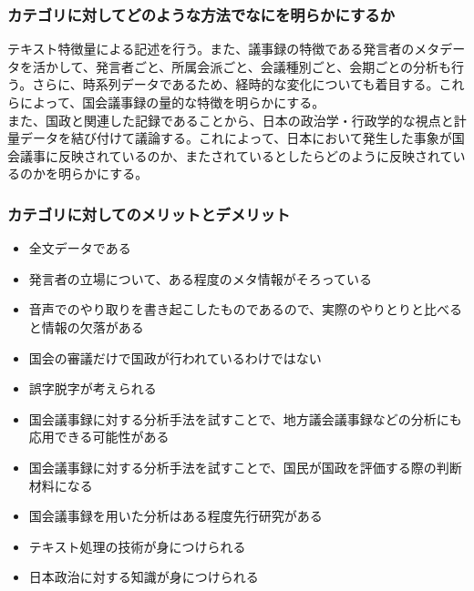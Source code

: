 \hypertarget{ux30abux30c6ux30b4ux30eaux306bux5bfeux3057ux3066ux3069ux306eux3088ux3046ux306aux65b9ux6cd5ux3067ux306aux306bux3092ux660eux3089ux304bux306bux3059ux308bux304b}{%
\subsubsection{カテゴリに対してどのような方法でなにを明らかにするか}\label{ux30abux30c6ux30b4ux30eaux306bux5bfeux3057ux3066ux3069ux306eux3088ux3046ux306aux65b9ux6cd5ux3067ux306aux306bux3092ux660eux3089ux304bux306bux3059ux308bux304b}}

テキスト特徴量による記述を行う。また、議事録の特徴である発言者のメタデータを活かして、発言者ごと、所属会派ごと、会議種別ごと、会期ごとの分析も行う。さらに、時系列データであるため、経時的な変化についても着目する。これらによって、国会議事録の量的な特徴を明らかにする。\\
また、国政と関連した記録であることから、日本の政治学・行政学的な視点と計量データを結び付けて議論する。これによって、日本において発生した事象が国会議事に反映されているのか、またされているとしたらどのように反映されているのかを明らかにする。

\hypertarget{ux30abux30c6ux30b4ux30eaux306bux5bfeux3057ux3066ux306eux30e1ux30eaux30c3ux30c8ux3068ux30c7ux30e1ux30eaux30c3ux30c8}{%
\subsubsection{カテゴリに対してのメリットとデメリット}\label{ux30abux30c6ux30b4ux30eaux306bux5bfeux3057ux3066ux306eux30e1ux30eaux30c3ux30c8ux3068ux30c7ux30e1ux30eaux30c3ux30c8}}

\begin{itemize}
\tightlist
\item
  全文データである
\item
  発言者の立場について、ある程度のメタ情報がそろっている
\item
  音声でのやり取りを書き起こしたものであるので、実際のやりとりと比べると情報の欠落がある
\item
  国会の審議だけで国政が行われているわけではない
\item
  誤字脱字が考えられる
\item
  国会議事録に対する分析手法を試すことで、地方議会議事録などの分析にも応用できる可能性がある
\item
  国会議事録に対する分析手法を試すことで、国民が国政を評価する際の判断材料になる
\item
  国会議事録を用いた分析はある程度先行研究がある
\item
  テキスト処理の技術が身につけられる
\item
  日本政治に対する知識が身につけられる
\end{itemize}

